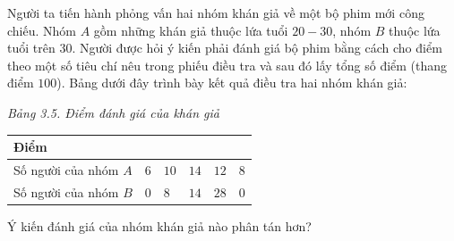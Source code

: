 \begin{bt}[Mức độ 2]%
Người ta tiến hành phỏng vấn hai nhóm khán giả về một bộ phim mới công chiếu. Nhóm $A$ gồm những khán giả thuộc lứa tuổi $20-30$, nhóm $B$ thuộc lứa tuổi trên $30$. Người được hỏi ý kiến phải đánh giá bộ phim bằng cách cho điểm theo một số tiêu chí nêu trong phiếu điều tra và sau đó lấy tổng số điểm (thang điểm $100$). Bảng dưới đây trình bày kết quả điều tra hai nhóm khán giả:
\begin{center}
	{\it Bảng 3.5. Điểm đánh giá của khán giả}\\
	\begin{tabular}{|p{4cm}|p{2cm}|p{2cm}|p{2cm}|p{2cm}|p{2cm}|}
		\hline Điểm &\centering\arraybackslash {$[50; 60)$} &\centering\arraybackslash {$[60; 70)$} &\centering\arraybackslash {$[70; 80)$} &\centering\arraybackslash {$[80;90)$} &\centering\arraybackslash {$[90; 100)$} \\
		\hline Số người của nhóm $A$&\centering\arraybackslash $6$ &\centering\arraybackslash $10$&\centering\arraybackslash $14$ &\centering\arraybackslash $12$ &\centering\arraybackslash $8$ \\
		\hline Số người của nhóm $B$&\centering\arraybackslash $0$ &\centering\arraybackslash $8$ &\centering\arraybackslash $14$ &\centering\arraybackslash $28$ &\centering\arraybackslash $0$ \\
		\hline
	\end{tabular}
\end{center}
Ý kiến đánh giá của nhóm khán giả nào phân tán hơn?
\end{bt}

